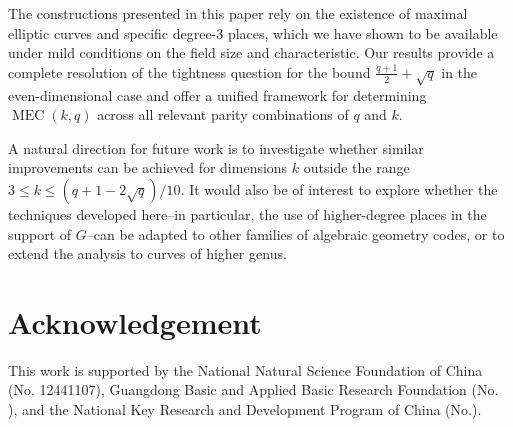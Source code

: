 \documentclass[journal,12pt,onecolumn]{IEEEtran}
\begin{document}
The constructions presented in this paper rely on the existence of maximal elliptic curves and specific degree-$3$ places, which we have shown to be available under mild conditions on the field size and characteristic. Our results provide a complete resolution of the tightness question for the bound $\frac{q+1}{2}+\sqrt{q}$ in the even-dimensional case and offer a unified framework for determining $\operatorname{MEC}(k,q)$ across all relevant parity combinations of $q$ and $k$.

A natural direction for future work is to investigate whether similar improvements can be achieved for dimensions $k$ outside the range $3 \le k \le (q+1-2\sqrt{q})/10$. It would also be of interest to explore whether the techniques developed here--in particular, the use of higher-degree places in the support of $G$--can be adapted to other families of algebraic geometry codes, or to extend the analysis to curves of higher genus.

\section*{Acknowledgement}

This work is supported by the National Natural Science Foundation of China (No. 12441107),   Guangdong Basic and Applied Basic Research Foundation (No. ), and the National Key Research and Development Program of
China (No.).



\end{document}
